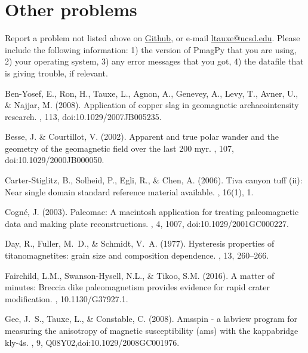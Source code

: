 \documentclass[11pt]{book}
\begin{document}
{{{\section{Other problems}Report a problem not listed above on \href{https://github.com/PmagPy/PmagPy/issues/new}{Github}, or e-mail \href{mailto:ltauxe@ucsd.edu}{ltauxe@ucsd.edu}. Please include the following information: 1) the version of PmagPy that you are using, 2) your operating system, 3) any error messages that you got, 4) the datafile that is giving trouble, if relevant.



\begin{thebibliography}{}

Ben-Yosef, E., Ron, H., Tauxe, L., Agnon, A., Genevey, A., Levy, T., Avner, U.,
  \& Najjar, M. (2008).
\newblock Application of copper slag in geomagnetic archaeointensity research.
, 113, doi:10.1029/2007JB005235.

Besse, J. \& Courtillot, V. (2002).
\newblock Apparent and true polar wander and the geometry of the geomagnetic
  field over the last 200 myr.
, 107, doi:10.1029/2000JB000050.

Carter-Stiglitz, B., Solheid, P., Egli, R., \& Chen, A. (2006).
\newblock Tiva canyon tuff (ii): Near single domain standard reference material
  available.
, 16(1), 1.

Cogn\'e, J. (2003).
\newblock Paleomac: A macintosh application for treating paleomagnetic data and
  making plate reconstructions.
, 4, 1007, doi:10.1029/2001GC000227.

Day, R., Fuller, M.~D., \& Schmidt, V.~A. (1977).
\newblock Hysteresis properties of titanomagnetites: grain size and composition
  dependence.
, 13, 260--266.

Fairchild, L.M., Swanson-Hysell, N.L., \& Tikoo, S.M. (2016).
\newblock A matter of minutes: Breccia dike paleomagnetism provides evidence for rapid crater modification.
, 10.1130/G37927.1.

Gee, J.~S., Tauxe, L., \& Constable, C. (2008).
\newblock Amsspin - a labview program for measuring the anisotropy of magnetic
  susceptibility (ams) with the kappabridge kly-4s.
, 9, Q08Y02,doi:10.1029/2008GC001976.


\end{thebibliography}}}}
\end{document}
